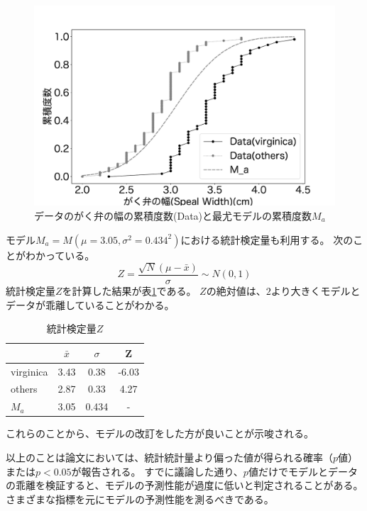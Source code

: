 \begin{figure}
    \begin{center}
        \includegraphics[width=15cm]{./image/15_/speal_width_viri.pdf}
        \caption{データのがく弁の幅の累積度数(Data)と最尤モデルの累積度数$M_a$}
        \label{fig:virginica_speal_width_fig}
    \end{center}
\end{figure}

モデル$M_a=M(\mu=3.05,\sigma^2=0.434^2)$における統計検定量も利用する。
次のことがわかっている。
\begin{equation*}
    Z = \frac{\sqrt{N}(\mu-\bar{x})}{\sigma} \sim N(0,1)
\end{equation*}
統計検定量$Z$を計算した結果が表\ref{table:speal_width_Z}である。
$Z$の絶対値は、$2$より大きくモデルとデータが乖離していることがわかる。

\begin{table}
    \caption{統計検定量$Z$}
    \label{table:speal_width_Z}
    \centering
    \begin{tabular}{lccc}
        \hline
        {} &   $\bar{x} $ &  $\sigma$  &     Z \\
        \hline \hline
        virginica &  3.43 &  0.38 & -6.03 \\
        others    &  2.87 &  0.33 &  4.27 \\
        $M_a$ & 3.05 & 0.434 & - \\
        \hline
    \end{tabular}
\end{table}

これらのことから、モデルの改訂をした方が良いことが示唆される。

以上のことは論文においては、統計統計量より偏った値が得られる確率（$p$値）または$p<0.05$が報告される。
すでに議論した通り、$p$値だけでモデルとデータの乖離を検証すると、モデルの予測性能が過度に低いと判定されることがある。さまざまな指標を元にモデルの予測性能を測るべきである。

